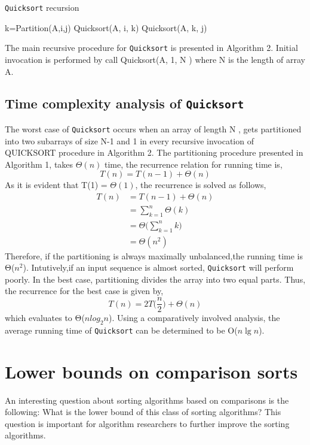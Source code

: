\documentclass[a4paper, 10pt,twocolumn]{article}
\begin{document}
\begin{algorithm}
  \caption{\texttt{Quicksort} recursion}
  \begin{algorithmic}[1]
    \newline
      \State k=Partition(A,i,j)
      \State Quicksort(A, i, k)
      \State Quicksort(A, k, j)
    \EndIf
    \EndProcedure
  \end{algorithmic}
\end{algorithm}
The main recursive procedure for \texttt{Quicksort} is presented in Algorithm 2. Initial invocation is performed by call Quicksort(A, 1, N ) where N is the length of array A.
\subsection{Time complexity analysis of \texttt{Quicksort}}
The worst case of \texttt{Quicksort} occurs when an array of length N , gets partitioned into two subarrays of size N-1 and 1 in every recursive invocation of QUICKSORT procedure in Algorithm 2. The partitioning procedure presented in Algorithm 1, takes $\Theta(n)$ time, the recurrence relation for running time is,
$$T(n)=T(n-1)+\Theta(n)$$
As it is evident that T(1) = $\Theta(1)$, the recurrence is solved as follows,
\begin{align*}
  T(n)&=T(n-1)+\Theta(n)\\
  &=\sum_{k=1}^{n}\Theta(k)\\
  &=\Theta \Big(\sum_{k=1}^{n}k \Big)\\
  &=\Theta(n^2)
\end{align*}
Therefore, if the partitioning is always maximally unbalanced,the running time is Θ($n^2$). Intutively,if an input sequence is almost sorted, \texttt{Quicksort} will perform poorly. In the best case, partitioning divides the array into two equal parts. Thus, the recurrence for the best case is given by,
$$T(n)=2T \Big(\frac{n}{2} \Big)+\Theta(n)$$
which evaluates to Θ($nlog_2 n$). Using a comparatively involved analysis, the average running time of \texttt{Quicksort} can be determined to be O($n\lg n$).
\section{Lower bounds on comparison sorts}
An interesting question about sorting algorithms based on comparisons is the following: What is the lower bound of this class of sorting algorithms? This question is important for algorithm researchers to further improve the sorting algorithms.
\end{document}
